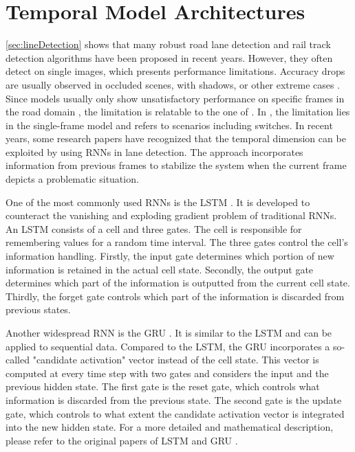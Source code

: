 \section{Temporal Model Architectures}
\label{sec:temporalModelArchitecture}

\autoref{sec:lineDetection} shows that many robust road lane detection and rail track detection algorithms have been proposed in recent years.
However, they often detect on single images, which presents performance limitations.
Accuracy drops are usually observed in occluded scenes, with shadows, or other extreme cases \cite{robustLaneDetection2020}.
Since models usually only show unsatisfactory performance on specific frames in the road domain \cite{robustLaneDetection2020}, the limitation is relatable to the one of \cite{tepNet2024}.
In \cite{tepNet2024}, the limitation lies in the single-frame model and refers to scenarios including switches.
In recent years, some research papers have recognized that the temporal dimension can be exploited by using \ac{RNN}s in lane detection.
The approach incorporates information from previous frames to stabilize the system when the current frame depicts a problematic situation.

One of the most commonly used \ac{RNN}s is the \ac{LSTM} \cite{LSTM2014}.
It is developed to counteract the vanishing and exploding gradient problem of traditional \ac{RNN}s.
An \ac{LSTM} consists of a cell and three gates.
The cell is responsible for remembering values for a random time interval.
The three gates control the cell's information handling.
Firstly, the input gate determines which portion of new information is retained in the actual cell state.
Secondly, the output gate determines which part of the information is outputted from the current cell state.
Thirdly, the forget gate controls which part of the information is discarded from previous states.

Another widespread \ac{RNN} is the \ac{GRU} \cite{GRU2014}.
It is similar to the \ac{LSTM} and can be applied to sequential data.
Compared to the \ac{LSTM}, the \ac{GRU} incorporates a so-called "candidate activation" vector instead of the cell state.
This vector is computed at every time step with two gates and considers the input and the previous hidden state.
The first gate is the reset gate, which controls what information is discarded from the previous state.
The second gate is the update gate, which controls to what extent the candidate activation vector is integrated into the new hidden state. 
For a more detailed and mathematical description, please refer to the original papers of \ac{LSTM} \cite{LSTM2014} and \ac{GRU} \cite{GRU2014}.

